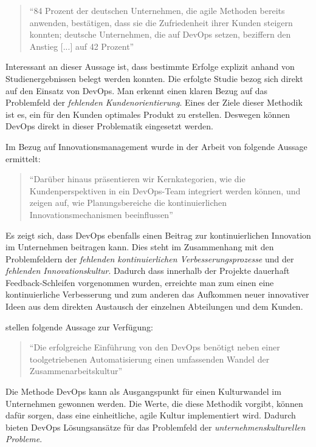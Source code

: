\begin{quote}
	``84 Prozent der deutschen Unternehmen, die agile Methoden bereits anwenden, bestätigen, dass sie die Zufriedenheit ihrer Kunden steigern konnten; deutsche Unternehmen, die auf DevOps setzen, beziffern den Anstieg [...] auf 42 Prozent'' \cite{drilling_agilitat_nodate}
\end{quote}

Interessant an dieser Aussage ist, dass bestimmte Erfolge explizit anhand von Studienergebnissen belegt werden konnten. Die erfolgte Studie bezog sich direkt auf den Einsatz  von DevOps. Man erkennt einen klaren Bezug auf das Problemfeld der \textit{fehlenden Kundenorientierung}. Eines der Ziele dieser Methodik ist es, ein für den Kunden optimales Produkt zu erstellen. Deswegen können DevOps direkt in dieser Problematik eingesetzt werden.

Im Bezug auf Innovationsmanagement wurde in der Arbeit von  folgende Aussage ermittelt:

\begin{quote}
	``Darüber hinaus präsentieren wir Kernkategorien, wie die Kundenperspektiven in ein DevOps-Team integriert werden können, und zeigen auf, wie Planungsbereiche die kontinuierlichen Innovationsmechanismen beeinflussen'' \cite[S. 1]{wiedemann_implementing_2019} 
\end{quote}

Es zeigt sich, dass DevOps ebenfalls einen Beitrag zur kontinuierlichen Innovation im Unternehmen beitragen kann. Dies steht im Zusammenhang mit den Problemfeldern der \textit{fehlenden kontinuierlichen Verbesserungsprozesse} und der \textit{fehlenden Innovationskultur}. Dadurch dass innerhalb der Projekte dauerhaft Feedback-Schleifen vorgenommen wurden, erreichte man zum einen eine kontinuierliche Verbesserung und zum anderen das Aufkommen neuer innovativer Ideen aus dem direkten Austausch der einzelnen Abteilungen und dem Kunden.

 stellen folgende Aussage zur Verfügung:

\begin{quote}
	``Die erfolgreiche Einführung von den DevOps benötigt neben einer toolgetriebenen Automatisierung einen umfassenden Wandel der Zusammenarbeitskultur'' \cite[S. 53]{alt_innovationsorientiertes_2017}
\end{quote}

Die Methode DevOps kann als Ausgangspunkt für einen Kulturwandel im Unternehmen gewonnen werden. Die Werte, die diese Methodik vorgibt, können dafür sorgen, dass eine einheitliche, agile Kultur implementiert wird. Dadurch bieten DevOps Lösungsansätze für das Problemfeld der \textit{unternehmenskulturellen Probleme}.

